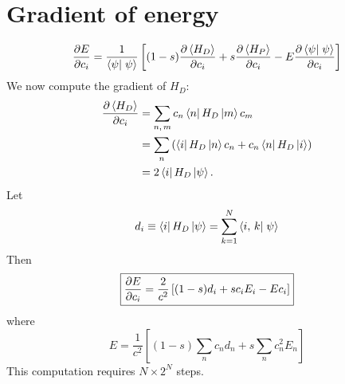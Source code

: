 \section*{Gradient of energy}
\begin{equation}
  \pd{E}{c_i} = \frac{1}{\braket{\psi}{\psi}}
  \left[ (1-s) \pd{\avg{H_D}}{c_i} + s \pd{\avg{H_P}}{c_i}
  - E \pd{\braket{\psi}{\psi}}{c_i} \right]
  \label{}
\end{equation}
We now compute the gradient of $H_D$:
\begin{align}
  \pd{\avg{H_D}}{c_i}
  &= \sum_{n,\,m} c_n \matrixel{n}{H_D}{m} c_m \\
  &= \sum_n \left( \matrixel{i}{H_D}{n} c_n + c_n \matrixel{n}{H_D}{i} \right) \\
  &= 2 \matrixel{i}{H_D}{\psi}.
  \label{}
\end{align}
Let
\begin{equation}
  d_i
  \equiv \matrixel{i}{H_D}{\psi}
  = \sum_{k=1}^N \braket{\nghbr{i}{k}}{\psi}
  \label{}
\end{equation}
Then
\begin{equation}
  \boxed{
    \frac{\partial E}{\partial c_i} = \frac{2}{c^2} \left[ (1-s) d_i + s c_i E_i - E c_i \right]
  }
  \label{}
\end{equation}
where
\begin{equation}
  \boxed{
    E = \frac{1}{c^2} \left[ (1-s) \sum_n c_n d_n + s \sum_n c_n^2 E_n \right]
  }
  \label{}
\end{equation}
This computation requires $N \times 2^N$ steps.



